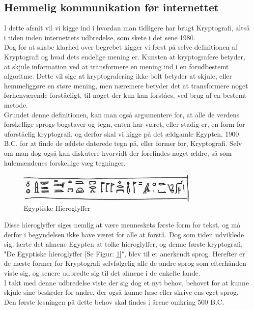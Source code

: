 \subsection{Hemmelig kommunikation før internettet}
I dette afsnit vil vi kigge ind i hvordan man tidligere har brugt Kryptografi, altså i tiden inden internettets udbredelse, som skete i det sene 1980. \\
Dog for at skabe klarhed over begrebet kigger vi først på selve definitionen af Kryptografi og hvad dets endelige mening er. 
Kunsten at kryptografere betyder, at skjule information ved at transformere en mening ind i en forudbestemt algoritme.
Dette vil sige at kryptografering ikke bolt betyder at skjule, eller hemmeliggøre en støre mening, men næremere betyder det at transformere noget førhenværende forståeligt, til noget der kun kan forståes, ved brug af en bestemt metode.\cite{MeningOfCryptography}\\
Grundet denne definitionen, kan man også argumentere for, at alle de verdens forskellige sprogs bogstaver og tegn, enten har været, eller stadig er, en form for uforståelig kryptografi, og derfor skal vi kigge på det ældgamle Egypten, 1900 B.C. for at finde de ældste daterede tegn på, eller former for, Kryptografi.\cite{PastCryptography} Selv om man dog også kan diskutere hvorvidt der forefindes noget ældre, så som hulemændenes forskellige væg tegninger.
\begin{figure}[H]
    \centering
    \includegraphics[width=0.8\textwidth, angle =0]{Projectdoc/egypten14.jpg}
    \caption{Egyptiske Hieroglyffer}
    \label{fig:hieroglyffer}
\end{figure}
\noindent
Disse hieroglyffer siges nemlig at være menneskets første form for tekst, og må derfor i begyndelsen ikke have været for alle at forstå. Dog som tiden udviklede sig, lærte det almene Egypten at tolke hieroglyffer, og denne første kryptografi, "De Egyptiske hieroglyffer [Se Figur: \ref{fig:hieroglyffer}]", blev til et anerkendt sprog.
Herefter er de næste former for Kryptografi selvfølgelig alle de andre sprog som efterhånden viste sig, og senere udbredte sig til det almene i de enkelte lande.\\
I takt med denne udbredelse viste der sig dog et nyt behov, behovet for at kunne skjule sine beskeder for andre, der også kunne læse eller skrive ens eget sprog. Den første løsningen på dette behov skal findes i årene omkring 500 B.C.\cite{PastCryptography} \\
